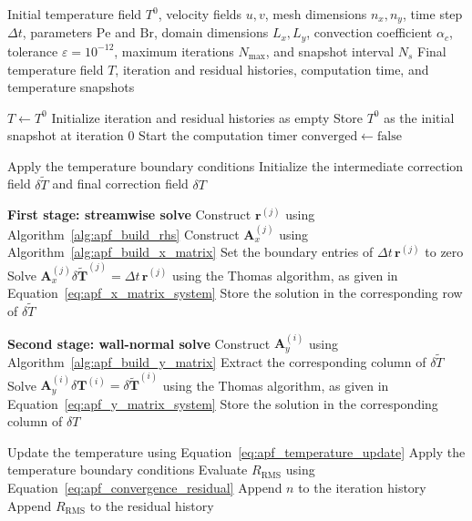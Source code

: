 \begin{algorithm}[H]
\caption{APF Pseudo-Time Marching to Steady State}
\label{alg:apf_complete_solver}
\begin{algorithmic}[1]
\Require Initial temperature field $T^0$, velocity fields
$u,v$, mesh dimensions $n_x,n_y$, time step $\Delta t$,
parameters $\mathrm{Pe}$ and $\mathrm{Br}$, domain dimensions
$L_x,L_y$, convection coefficient $\alpha_c$, tolerance
$\varepsilon=10^{-12}$, maximum iterations $N_{\max}$,
and snapshot interval $N_s$
\Ensure Final temperature field $T$, iteration and residual
histories, computation time, and temperature snapshots

\State $T\gets T^0$
\State Initialize iteration and residual histories as empty
\State Store $T^0$ as the initial snapshot at iteration $0$
\State Start the computation timer
\State $\mathrm{converged}\gets\mathrm{false}$

    \State Apply the temperature boundary conditions
    \State Initialize the intermediate correction field
    $\delta\widetilde{T}$ and final correction field $\delta T$

    \Statex
    \State \textbf{First stage: streamwise solve}
        \State Construct $\mathbf{r}^{(j)}$ using
        Algorithm~\ref{alg:apf_build_rhs}
        \State Construct $\mathbf{A}_x^{(j)}$ using
        Algorithm~\ref{alg:apf_build_x_matrix}
        \State Set the boundary entries of
        $\Delta t\,\mathbf{r}^{(j)}$ to zero
        \State Solve
        $\mathbf{A}_x^{(j)}
        \delta\widetilde{\mathbf{T}}^{(j)}
        =\Delta t\,\mathbf{r}^{(j)}$
        using the Thomas algorithm, as given in
        Equation~\eqref{eq:apf_x_matrix_system}
        \State Store the solution in the corresponding row of
        $\delta\widetilde{T}$
    \EndFor

    \Statex
    \State \textbf{Second stage: wall-normal solve}
        \State Construct $\mathbf{A}_y^{(i)}$ using
        Algorithm~\ref{alg:apf_build_y_matrix}
        \State Extract the corresponding column of
        $\delta\widetilde{T}$
        \State Solve
        $\mathbf{A}_y^{(i)}\delta\mathbf{T}^{(i)}
        =\delta\widetilde{\mathbf{T}}^{(i)}$
        using the Thomas algorithm, as given in
        Equation~\eqref{eq:apf_y_matrix_system}
        \State Store the solution in the corresponding column
        of $\delta T$
    \EndFor

    \Statex
    \State Update the temperature using
    Equation~\eqref{eq:apf_temperature_update}
    \State Apply the temperature boundary conditions
    \State Evaluate $R_{\mathrm{RMS}}$ using
    Equation~\eqref{eq:apf_convergence_residual}
    \State Append $n$ to the iteration history
    \State Append $R_{\mathrm{RMS}}$ to the residual history


\end{algorithmic}
\end{algorithm}
